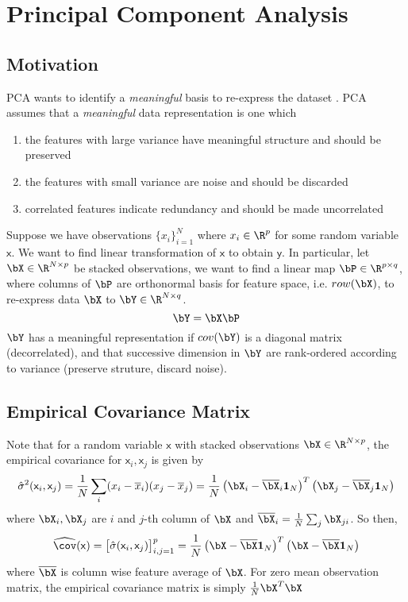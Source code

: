 \documentclass[11pt]{article}
\newcommand\ry{\ensuremath{\mathsf{y}}}
\newcommand\rx{\ensuremath{\mathsf{x}}}
\begin{document}
\section{Principal Component Analysis}

\subsection{Motivation} 

PCA wants to identify a \textit{meaningful} basis to re-express the dataset \cite{shlensTutorialPrincipalComponent2014}. PCA assumes that a \textit{meaningful} data representation is one which
\begin{enumerate}
    \item the features with large variance have meaningful structure and should be preserved
    \item the features with small variance are noise and should be discarded
    \item correlated features indicate redundancy and should be made uncorrelated
\end{enumerate}
Suppose we have observations $\{x_i\}_{i=1}^N$ where $x_i\in \R^p$ for some random variable $\rx$. We want to find linear transformation of $\rx$ to obtain $\ry$. In particular, let $\bX \in \R^{N\times p}$ be stacked observations, we want to find a linear map $\bP \in \R^{p\times q}$, where columns of $\bP$ are orthonormal basis for feature space, i.e. $row(\bX)$, to re-express data $\bX$ to $\bY \in \R^{N\times q}$.
\[
    \bY = \bX \bP    
\]
$\bY$ has a meaningful representation if $cov(\bY)$ is a diagonal matrix (decorrelated), and that successive dimension in $\bY$ are rank-ordered according to variance (preserve struture, discard noise). 

\subsection{Empirical Covariance Matrix}

Note that for a random variable $\rx$ with stacked observations $\bX\in\R^{N\times p}$, the empirical covariance for $\rx_i,\rx_j$ is given by 
\[
    \hat{\sigma}^2(\rx_i,\rx_j)
    = \frac{1}{N} \sum_i (x_i-\overline{x}_i)(x_j-\overline{x}_j) 
    = \frac{1}{N} \left( \bX_i - \overline{\bX}_i \mathbf{1}_N \right)^T \left( \bX_j - \overline{\bX}_j \mathbf{1}_N \right)
\]
where $\bX_i,\bX_j$ are $i$ and $j$-th column of $\bX$ and $\overline{\bX}_i = \frac{1}{N} \sum_j \bX_{ji}$. So then,
\[
    \widehat{\cov}(\rx) 
    = \begin{bmatrix}
        \hat{\sigma}(\rx_i,\rx_j)
    \end{bmatrix}_{i,j=1}^p
    = \frac{1}{N} \left( \bX - \overline{\bX} \mathbf{1}_N \right)^T \left( \bX - \overline{\bX} \mathbf{1}_N \right)
\]
where $\overline{\bX}$ is column wise feature average of $\bX$. For zero mean observation matrix, the empirical covariance matrix is simply $\frac{1}{N} \bX^T \bX$
\end{document}
